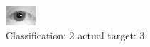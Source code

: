 \begin{figure}[h!]
\begin{center}
\includegraphics[width=0.60\columnwidth]{figures/ID1084_class_2_target_3.png}
\end{center}
\caption{ Classification: 2 actual target: 3}
\label{fig:ID1084_class_2_target_3}
\end{figure}

